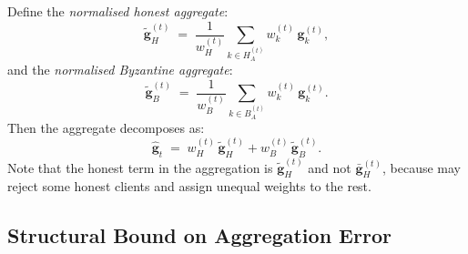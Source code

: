 \documentclass[../main]{subfiles}
\begin{document}
Define the \emph{normalised honest aggregate}:
\begin{equation}
    \widetilde{\mathbf{g}}_H^{(t)} \;=\; \frac{1}{w_H^{(t)}} \sum_{k \in H_A^{(t)}} w_k^{(t)}\, \mathbf{g}_k^{(t)},
    \label{eq:normalised_honest}
\end{equation}
and the \emph{normalised Byzantine aggregate}:
\begin{equation}
    \widetilde{\mathbf{g}}_B^{(t)} \;=\; \frac{1}{w_B^{(t)}} \sum_{k \in B_A^{(t)}} w_k^{(t)}\, \mathbf{g}_k^{(t)}.
    \label{eq:normalised_byz}
\end{equation}
Then the \aegis{} aggregate decomposes as:
\begin{equation}
    \hat{\mathbf{g}}_t \;=\; w_H^{(t)}\,\widetilde{\mathbf{g}}_H^{(t)} + w_B^{(t)}\,\widetilde{\mathbf{g}}_B^{(t)}.
    \label{eq:agg_decomp}
\end{equation}
Note that the honest term in the aggregation is $\widetilde{\mathbf{g}}_H^{(t)}$ and not
$\bar{\mathbf{g}}_H^{(t)}$, because \aegis{} may reject some honest clients and assign
unequal weights to the rest.

\subsection{Structural Bound on Aggregation Error}
\end{document}
